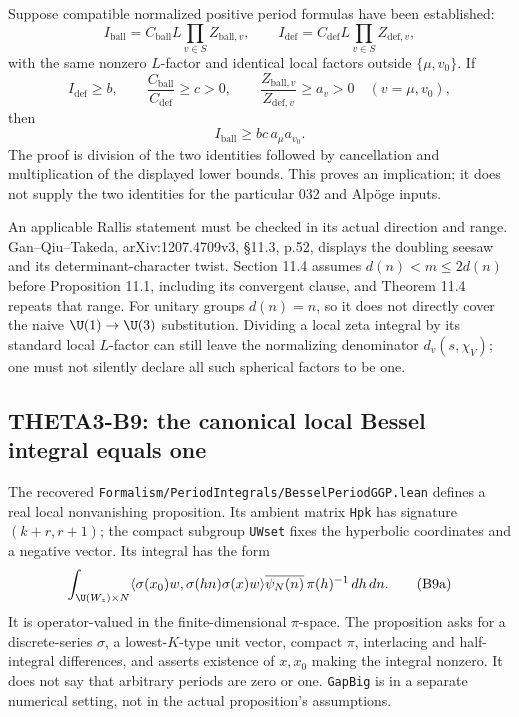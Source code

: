 Suppose compatible normalized positive period formulas have been established:
\[
 I_{\mathrm{ball}}=C_{\mathrm{ball}}L\prod_{v\in S}Z_{\mathrm{ball},v},
 \qquad
 I_{\mathrm{def}}=C_{\mathrm{def}}L\prod_{v\in S}Z_{\mathrm{def},v},
\]
with the same nonzero $L$-factor and identical local factors outside
$\{\mu,v_0\}$. If
\[
 I_{\mathrm{def}}\geq b,\qquad
 \frac{C_{\mathrm{ball}}}{C_{\mathrm{def}}}\geq c>0,
 \qquad \frac{Z_{\mathrm{ball},v}}{Z_{\mathrm{def},v}}\geq a_v>0
 \quad(v=\mu,v_0),
\]
then
\[
 I_{\mathrm{ball}}\geq bc\,a_\mu a_{v_0}.
\]
The proof is division of the two identities followed by cancellation and multiplication of the displayed lower bounds. This proves an implication; it does not supply the two identities for the particular 032 and Alp\"oge inputs.

An applicable Rallis statement must be checked in its actual direction and range. Gan--Qiu--Takeda, arXiv:1207.4709v3, \S11.3, p.52, displays the doubling seesaw and its determinant-character twist. Section 11.4 assumes $d(n)<m\leq2d(n)$ before Proposition 11.1, including its convergent clause, and Theorem 11.4 repeats that range. For unitary groups $d(n)=n$, so it does not directly cover the naive $\U(1)\to\U(3)$ substitution. Dividing a local zeta integral by its standard local $L$-factor can still leave the normalizing denominator $d_v(s,\chi_V)$; one must not silently declare all such spherical factors to be one.

\subsection{THETA3-B9: the canonical local Bessel integral equals one}\label{B9}

The recovered \texttt{Formalism/PeriodIntegrals/BesselPeriodGGP.lean} defines a real local nonvanishing proposition. Its ambient matrix \texttt{Hpk} has signature $(k+r,r+1)$; the compact subgroup \texttt{UWset} fixes the hyperbolic coordinates and a negative vector. Its integral has the form
\[
 \int_{\U(W_z)\times N}
 \langle\sigma(x_0)w,\sigma(hn)\sigma(x)w\rangle
       \overline{\psi_N(n)}\,\pi(h)^{-1}\,dh\,dn.
 \tag{B9a}
\]
It is operator-valued in the finite-dimensional $\pi$-space. The proposition asks for a discrete-series $\sigma$, a lowest-$K$-type unit vector, compact $\pi$, interlacing and half-integral differences, and asserts existence of $x,x_0$ making the integral nonzero. It does not say that arbitrary periods are zero or one. \texttt{GapBig} is in a separate numerical setting, not in the actual proposition's assumptions.

